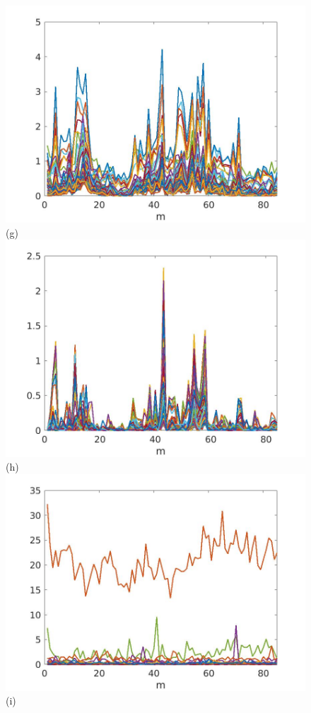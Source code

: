 \documentclass[journal]{IEEEtran}
\begin{document}
\begin{figure}[htp!]
\includegraphics[scale=.12]{../../figs/perc01_J3_euclid_sqrdif_change_locations}(g)
\includegraphics[scale=.12]{../../figs/perc01_consecdif_J3_euclid_sqrdif_change_locations}(h)\\
\includegraphics[scale=.12]{../../figs/perc01_J3_euclid_sqrdif_lowest_cor_locations}(i)

\end{figure}
\end{document}
